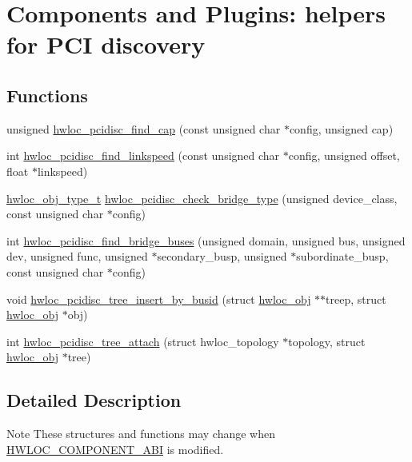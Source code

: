 \hypertarget{a00232}{}\section{Components and Plugins\+: helpers for P\+CI discovery}
\label{a00232}
\subsection*{Functions}
\begin{DoxyCompactItemize}
\item 
unsigned \hyperlink{a00232_ga706f71cfea09d547d2cbafa642d6e03b}{hwloc\+\_\+pcidisc\+\_\+find\+\_\+cap} (const unsigned char $\ast$config, unsigned cap)
\item 
int \hyperlink{a00232_ga51d1ebcbf9729987c9d17df3aa57d209}{hwloc\+\_\+pcidisc\+\_\+find\+\_\+linkspeed} (const unsigned char $\ast$config, unsigned offset, float $\ast$linkspeed)
\item 
\hyperlink{a00184_gacd37bb612667dc437d66bfb175a8dc55}{hwloc\+\_\+obj\+\_\+type\+\_\+t} \hyperlink{a00232_ga6c55fb80c3d0c8c8e61078b3f38adde8}{hwloc\+\_\+pcidisc\+\_\+check\+\_\+bridge\+\_\+type} (unsigned device\+\_\+class, const unsigned char $\ast$config)
\item 
int \hyperlink{a00232_ga95acf6822a49447c11067d0b843965ba}{hwloc\+\_\+pcidisc\+\_\+find\+\_\+bridge\+\_\+buses} (unsigned domain, unsigned bus, unsigned dev, unsigned func, unsigned $\ast$secondary\+\_\+busp, unsigned $\ast$subordinate\+\_\+busp, const unsigned char $\ast$config)
\item 
void \hyperlink{a00232_gab76ddc4f55db8101ef0d44317965128c}{hwloc\+\_\+pcidisc\+\_\+tree\+\_\+insert\+\_\+by\+\_\+busid} (struct \hyperlink{a00238}{hwloc\+\_\+obj} $\ast$$\ast$treep, struct \hyperlink{a00238}{hwloc\+\_\+obj} $\ast$obj)
\item 
int \hyperlink{a00232_gabda1d6c1799e50b9226f8a4da9bd29ea}{hwloc\+\_\+pcidisc\+\_\+tree\+\_\+attach} (struct hwloc\+\_\+topology $\ast$topology, struct \hyperlink{a00238}{hwloc\+\_\+obj} $\ast$tree)
\end{DoxyCompactItemize}


\subsection{Detailed Description}
\begin{DoxyNote}{Note}
These structures and functions may change when \hyperlink{a00182_gaac5bc1f46f55e10ef0141a68ce70e21f}{H\+W\+L\+O\+C\+\_\+\+C\+O\+M\+P\+O\+N\+E\+N\+T\+\_\+\+A\+BI} is modified. 
\end{DoxyNote}


